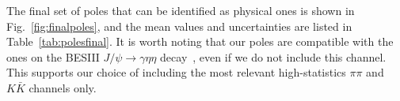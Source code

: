 The final set of poles that can be identified as physical ones is shown in Fig.~\ref{fig:finalpoles}, and the mean values and uncertainties are listed in Table~\ref{tab:polesfinal}. It is worth noting that our poles are compatible with the ones on the BESIII $J/\psi \to \gamma \eta\eta$ decay~\cite{BESIII:2013qqz}, even if we do not include this channel. This supports our choice of including the most relevant high-statistics $\pi \pi$ and $K \bar K$ channels only.

